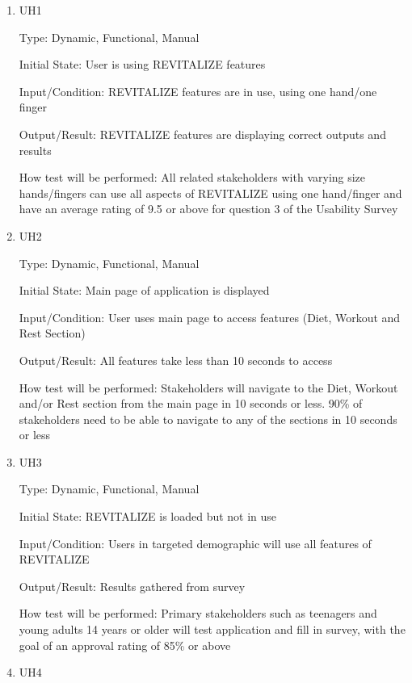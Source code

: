 \documentclass[12pt, titlepage]{article}
\begin{document}
\begin{enumerate}

\item{UH1\\}

Type: Dynamic, Functional, Manual
					
Initial State: User is using REVITALIZE features
					
Input/Condition: REVITALIZE features are in use, using one hand/one finger
					
Output/Result: REVITALIZE features are displaying correct outputs and results
					
How test will be performed: All related stakeholders with varying size hands/fingers can use all aspects of REVITALIZE using one hand/finger and have an average rating of 9.5 or above for question 3 of the Usability Survey
					
\item{UH2\\}

Type: Dynamic, Functional, Manual
					
Initial State: Main page of application is displayed
					
Input/Condition: User uses main page to access features (Diet, Workout and Rest Section)
					
Output/Result: All features take less than 10 seconds to access
					
How test will be performed: Stakeholders will navigate to the Diet, Workout and/or Rest section from the main page in 10 seconds or less. 90\% of stakeholders need to be able to navigate to any of the sections in 10 seconds or less

\item{UH3\\}

Type: Dynamic, Functional, Manual
					
Initial State: REVITALIZE is loaded but not in use
					
Input/Condition: Users in targeted demographic will use all features of REVITALIZE
					
Output/Result: Results gathered from survey
					
How test will be performed: Primary stakeholders such as teenagers and young adults 14 years or older will test application and fill in survey, with the goal of an approval rating of 85\% or above

\item{UH4\\}


\end{enumerate}
\end{document}
